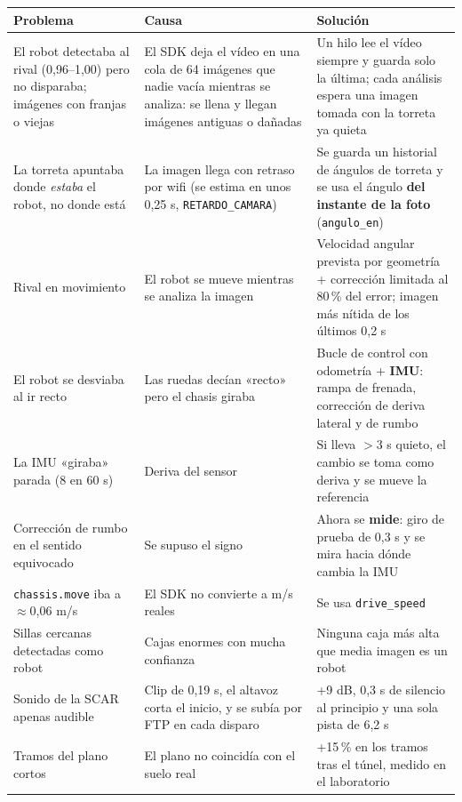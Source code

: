 \documentclass[11pt,a4paper]{article}
\newcommand{\cod}[1]{\texttt{#1}}
\newcommand{\gr}{\textdegree{}}
\begin{document}
\begin{longtable}{@{}P{4cm}P{5.4cm}P{5.1cm}@{}}
\toprule
\textbf{Problema} & \textbf{Causa} & \textbf{Solución} \\
\midrule
\endhead
El robot detectaba al rival (0,96--1,00) pero no disparaba; imágenes con franjas o viejas & El SDK deja el vídeo en una cola de 64 imágenes que nadie vacía mientras se analiza: se llena y llegan imágenes antiguas o dañadas & Un hilo lee el vídeo siempre y guarda solo la última; cada análisis espera una imagen tomada con la torreta ya quieta \\
La torreta apuntaba donde \emph{estaba} el robot, no donde está & La imagen llega con retraso por wifi (se estima en unos 0,25 s, \cod{RETARDO\_\allowbreak{}CAMARA}) & Se guarda un historial de ángulos de torreta y se usa el ángulo \textbf{del instante de la foto} (\cod{angulo\_\allowbreak{}en}) \\
Rival en movimiento & El robot se mueve mientras se analiza la imagen & Velocidad angular prevista por geometría + corrección limitada al 80\,\% del error; imagen más nítida de los últimos 0,2 s \\
El robot se desviaba al ir recto & Las ruedas decían «recto» pero el chasis giraba & Bucle de control con odometría + \textbf{IMU}: rampa de frenada, corrección de deriva lateral y de rumbo \\
La IMU «giraba» parada (8\gr{} en 60 s) & Deriva del sensor & Si lleva $>$3 s quieto, el cambio se toma como deriva y se mueve la referencia \\
Corrección de rumbo en el sentido equivocado & Se supuso el signo & Ahora se \textbf{mide}: giro de prueba de 0,3 s y se mira hacia dónde cambia la IMU \\
\texttt{chassis.move} iba a $\approx$0,06 m/s & El SDK no convierte a m/s reales & Se usa \texttt{drive\_speed} \\
Sillas cercanas detectadas como robot & Cajas enormes con mucha confianza & Ninguna caja más alta que media imagen es un robot \\
Sonido de la SCAR apenas audible & Clip de 0,19 s, el altavoz corta el inicio, y se subía por FTP en cada disparo & +9 dB, 0,3 s de silencio al principio y una sola pista de 6,2 s \\
Tramos del plano cortos & El plano no coincidía con el suelo real & +15\,\% en los tramos tras el túnel, medido en el laboratorio \\
\bottomrule
\end{longtable}
\end{document}
